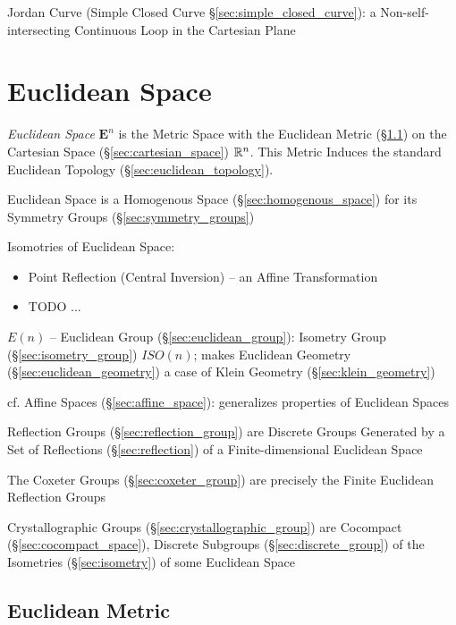 Jordan Curve (Simple Closed Curve \S\ref{sec:simple_closed_curve}): a
Non-self-intersecting Continuous Loop in the Cartesian Plane



\section{Euclidean Space}\label{sec:euclidean_space}

\emph{Euclidean Space} $\mathbf{E}^n$ is the Metric Space with the Euclidean
Metric (\S\ref{sec:euclidean_metric}) on the Cartesian Space
(\S\ref{sec:cartesian_space}) $\mathbb{R}^n$. This Metric Induces the standard
Euclidean Topology (\S\ref{sec:euclidean_topology}).

Euclidean Space is a Homogenous Space (\S\ref{sec:homogenous_space}) for its
Symmetry Groups (\S\ref{sec:symmetry_groups})

Isomotries of Euclidean Space:
\begin{itemize}
  \item Point Reflection (Central Inversion) -- an Affine Transformation
  \item TODO
  ...
\end{itemize}

$E(n)$ -- Euclidean Group (\S\ref{sec:euclidean_group}): Isometry Group
(\S\ref{sec:isometry_group}) $ISO(n)$; makes Euclidean Geometry
(\S\ref{sec:euclidean_geometry}) a case of Klein Geometry
(\S\ref{sec:klein_geometry})

cf. Affine Spaces (\S\ref{sec:affine_space}): generalizes properties
of Euclidean Spaces

Reflection Groups (\S\ref{sec:reflection_group}) are Discrete Groups Generated
by a Set of Reflections (\S\ref{sec:reflection}) of a Finite-dimensional
Euclidean Space

The Coxeter Groups (\S\ref{sec:coxeter_group}) are precisely the Finite
Euclidean Reflection Groups

Crystallographic Groups (\S\ref{sec:crystallographic_group}) are Cocompact
(\S\ref{sec:cocompact_space}), Discrete Subgroups (\S\ref{sec:discrete_group})
of the Isometries (\S\ref{sec:isometry}) of some Euclidean Space



\subsection{Euclidean Metric}\label{sec:euclidean_metric}

